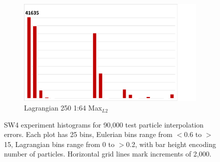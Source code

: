 \begin{figure}
\hspace{1mm}
\begin{subfigure}{0.24\textwidth}
\centering
\includegraphics[width=0.8\linewidth]{results/sw4/Lag4_Max.pdf}
\caption{Lagrangian 250 1:64 Max$_{L2}$}
\end{subfigure}
\caption{SW4 experiment histograms for 90,000 test particle interpolation errors. Each plot has 25 bins, Eulerian bins range from $<$0.6 to $>$15, Lagrangian bins range from 0 to $>$0.2, with bar height encoding number of particles. Horizontal grid lines mark increments of 2,000.}
\label{fig:sw4_histograms}
\end{figure}

